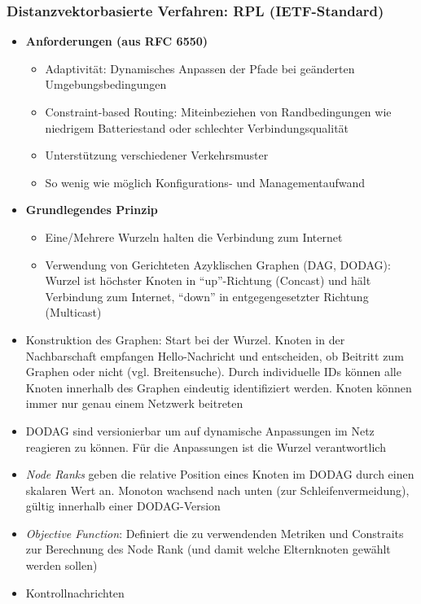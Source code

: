\subsubsection{Distanzvektorbasierte Verfahren: RPL (IETF-Standard)}
\begin{itemize}
	\item \textbf{Anforderungen (aus RFC 6550)}
	\begin{itemize}
		\item Adaptivität: Dynamisches Anpassen der Pfade bei geänderten Umgebungsbedingungen
		\item Constraint-based Routing: Miteinbeziehen von Randbedingungen wie niedrigem Batteriestand oder schlechter Verbindungsqualität
		\item Unterstützung verschiedener Verkehrsmuster
		\item So wenig wie möglich Konfigurations- und Managementaufwand
	\end{itemize}
	\item \textbf{Grundlegendes Prinzip}
	\begin{itemize}
		\item Eine/Mehrere Wurzeln halten die Verbindung zum Internet
		\item Verwendung von Gerichteten Azyklischen Graphen (DAG, DODAG): Wurzel ist höchster Knoten in "`up"'-Richtung (Concast) und hält Verbindung zum Internet, "`down"' in entgegengesetzter Richtung (Multicast)
	\end{itemize}
	\item Konstruktion des Graphen: Start bei der Wurzel. Knoten in der Nachbarschaft empfangen Hello-Nachricht und entscheiden, ob Beitritt zum Graphen oder nicht (vgl. Breitensuche). Durch individuelle IDs können alle Knoten innerhalb des Graphen eindeutig identifiziert werden. Knoten können immer nur genau einem Netzwerk beitreten
	\item DODAG sind versionierbar um auf dynamische Anpassungen im Netz reagieren zu können. Für die Anpassungen ist die Wurzel verantwortlich
	\item \textit{Node Ranks} geben die relative Position eines Knoten im DODAG durch einen skalaren Wert an. Monoton wachsend nach unten (zur Schleifenvermeidung), gültig innerhalb einer DODAG-Version
	\item \textit{Objective Function}: Definiert die zu verwendenden Metriken und Constraits zur Berechnung des Node Rank (und damit welche Elternknoten gewählt werden sollen)
	\item Kontrollnachrichten
	\begin{itemize}

\end{itemize}
\end{itemize}

